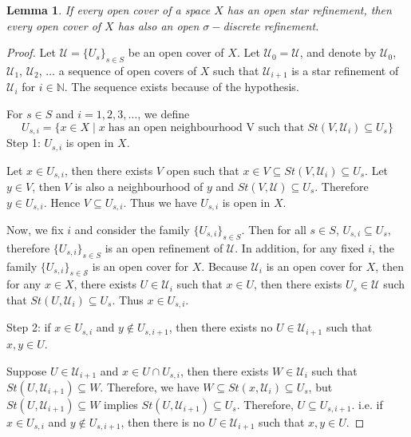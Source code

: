 \documentclass[12pt,oneside,english]{amsbook}
\numberwithin{equation}{section} %
\numberwithin{figure}{section} %
\theoremstyle{plain}
\numberwithin{section}{chapter}
\theoremstyle{plain}
\newtheorem{lem}[thm]{Lemma}
\begin{document}
\begin{lem} \label{lem:paracompact:12}
  If every open cover of a space $X$ has an open star refinement, then every open cover of $X$ has also an open $\sigma-$discrete refinement.
\end{lem}
\begin{proof}
Let $\mathcal{U} = \{U_{s}\}_{s \in S}$ be an open cover of $X$. Let $\mathcal{U}_{0} = \mathcal{U}$, and denote by $\mathcal{U}_0$, $\mathcal{U}_{1}$, $\mathcal{U}_{2}$, $\ldots$ a sequence of open covers of $X$ such that $\mathcal{U}_{i+1}$ is a star refinement of $\mathcal{U}_{i}$ for $i \in \mathbb{N}$. The sequence exists because of the hypothesis.

  For $s \in S$ and $i = 1,2,3, \ldots$, we define $$U_{s,i} = \{ x \in X \; | \; x \; \text{has an open neighbourhood V such that} \; St(V,\mathcal{U}_{i}) \subseteq U_{s}\}$$
  Step 1: $U_{s,i}$ is open in $X$.

  Let $x \in U_{s,i}$, then there exists $V$ open such that $x \in V \subseteq St(V,\mathcal{U}_{i}) \subseteq U_{s}$. Let $y \in V$, then $V$ is also a neighbourhood of $y$ and $St(V, \mathcal{U}) \subseteq U_{s}$. Therefore $y \in U_{s,i}$. Hence $V \subseteq U_{s,i}$. Thus we have $U_{s,i}$ is open in $X$.

  Now, we fix $i$ and consider the family $\{U_{s,i}\}_{s \in S}$. Then for all $s \in S$, $U_{s,i} \subseteq U_{s}$, therefore $\{U_{s,i}\}_{s \in S}$ is an open refinement of $\mathcal{U}$. In addition, for any fixed $i$, the family $\{U_{s,i}\}_{s \in \mathcal{S}}$ is an open cover for $X$. Because $\mathcal{U}_i$ is an open cover for $X$, then for any $x \in X$, there exists $U \in \mathcal{U}_i$ such that $x \in U$, then there exists $U_s \in \mathcal{U}$ such that $St(U, \mathcal{U}_i) \subseteq U_s$. Thus $x \in U_{s,i}$. 

  Step 2: if $x \in U_{s,i}$ and $y \notin U_{s,i+1}$, then there exists no $U \in \mathcal{U}_{i+1}$ such that $x,y \in U$.
  
  Suppose $U \in \mathcal{U}_{i+1}$ and $x \in U \cap U_{s, i}$, then there exists $W \in \mathcal{U}_{i}$ such that $St(U,\mathcal{U}_{i+1}) \subseteq W$. Therefore, we have $W \subseteq St(x,\mathcal{U}_{i})  \subseteq U_{s}$, but $St(U,\mathcal{U}_{i+1}) \subseteq W$ implies $St(U,\mathcal{U}_{i+1}) \subseteq U_{s}$. Therefore, $U \subseteq U_{s, i+1}$.  i.e. if  $x \in U_{s,i}$ and $y \notin U_{s,i+1}$, then there is no $U \in \mathcal{U}_{i+1}$ such that $x,y \in U$.



\end{proof}
\end{document}
